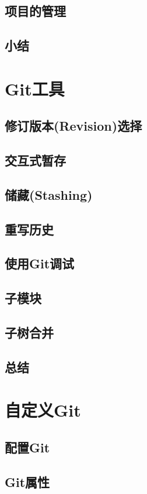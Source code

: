 \documentclass{book}
\begin{document}
	\section{项目的管理}
	\section{小结}

\chapter{Git工具}
	\section{修订版本(Revision)选择}
	\section{交互式暂存}
	\section{储藏(Stashing)}
	\section{重写历史}
	\section{使用Git调试}
	\section{子模块}
	\section{子树合并}
	\section{总结}

\chapter{自定义Git}
	\section{配置Git}
	\section{Git属性}
\end{document}
